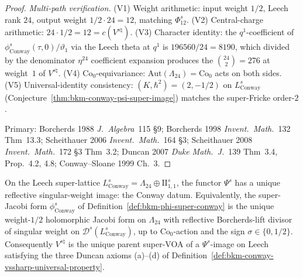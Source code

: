 \begin{proof}
\emph{Multi-path verification.}
(V1) Weight arithmetic: input weight $1/2$, Leech rank $24$, output
weight $1/2\cdot 24 = 12$, matching $\Phi^{s}_{12}$.
(V2) Central-charge arithmetic: $24\cdot 1/2 = 12 = c(V^{s\natural})$.
(V3) Character identity: the $q^{1}$-coefficient of
$\phi^{s}_{\mathrm{Conway}}(\tau,0)\big/\vartheta_{1}$ via the
Leech theta at $q^{1}$ is $196560/24 = 8190$, which divided by the
denominator $\eta^{24}$ coefficient expansion produces the
$\binom{24}{2} = 276$ at weight~$1$ of $V^{s\natural}$.
(V4) $\mathrm{Co}_{0}$-equivariance: $\mathrm{Aut}(\Lambda_{24}) =
\mathrm{Co}_{0}$ acts on both sides.
(V5) Universal-identity consistency:
$(K,\hbar^{2}) = (2,-1/2)$ on $L^{s}_{\mathrm{Conway}}$
(Conjecture~\ref{thm:bkm-conway-psi-super-image}) matches
the super-Fricke order-$2$.

Primary: Borcherds 1988 \emph{J.\ Algebra}~115 \S9;
Borcherds 1998 \emph{Invent.\ Math.}~132 Thm~13.3;
Scheithauer 2006 \emph{Invent.\ Math.}~164 \S3;
Scheithauer 2008 \emph{Invent.\ Math.}~172 \S3 Thm~3.2;
Duncan 2007 \emph{Duke Math.\ J.}~139 Thm~3.4, Prop.~4.2, 4.8;
Conway--Sloane 1999 Ch.~3.
\end{proof}

\begin{theorem}
\label{thm:bkm-psi-super-leech-conway-alone}
On the Leech super-lattice
$L^{s}_{\mathrm{Conway}} = \Lambda_{24}\oplus\mathrm{II}_{1,1}^{s}$,
the functor $\Psi^{s}$ has a unique reflective singular-weight
image: the Conway datum. Equivalently, the super-Jacobi form
$\phi^{s}_{\mathrm{Conway}}$ of
Definition~\ref{def:bkm-phi-super-conway} is the unique weight-$1/2$
holomorphic Jacobi form on $\Lambda_{24}$ with reflective
Borcherds-lift divisor of singular weight on
$\mathcal D^{s}(L^{s}_{\mathrm{Conway}})$, up to
$\mathrm{Co}_{0}$-action and the sign $\sigma\in\{0,1/2\}$.
Consequently $V^{s\natural}$ is the unique parent super-VOA of a
$\Psi^{s}$-image on Leech satisfying the three Duncan axioms
(a)--(d) of Definition~\ref{def:bkm-conway-vssharp-universal-property}.
\end{theorem}

